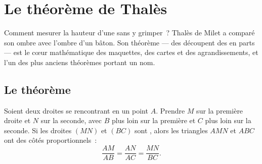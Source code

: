 \chapter{Le théorème de Thalès}\label{ch:g9:thales}

Comment mesurer la hauteur d'une  sans y grimper~? Thalès de
Milet a comparé son ombre avec l'ombre d'un bâton. Son théorème --- des
 découpent des  en parts  ---
est le cœur mathématique des maquettes, des cartes et des agrandissements,
et l'un des plus anciens théorèmes portant un nom.

\section{Le théorème}

\begin{theorem}[Thalès]\label{thm:g9:thales:direct}
Soient deux droites se rencontrant en un point $A$. Prendre $M$ sur la
première droite et $N$ sur la seconde, avec $B$ plus loin sur la
première et $C$ plus loin sur la seconde. Si les droites $(MN)$ et
$(BC)$ sont \emph{}, alors les triangles $AMN$ et $ABC$ ont
des côtés proportionnels~:
\[
\frac{AM}{AB} = \frac{AN}{AC} = \frac{MN}{BC}.
\]
\end{theorem}
\admitted

